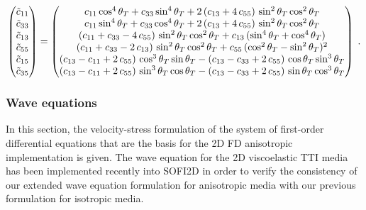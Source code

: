 \begin{equation}
    \begin{pmatrix}
    \Tilde{c}_{11} \\
    \Tilde{c}_{33} \\
    \Tilde{c}_{13} \\
    \Tilde{c}_{55} \\
    \Tilde{c}_{15} \\
    \Tilde{c}_{35} \\
    \end{pmatrix} = 
    \begin{pmatrix}
    c_{11}\cos^{4}\theta_T+c_{33}\sin^{4}\theta_T+2\,(c_{13}+4\,c_{55})\,\sin^{2}\theta_T\cos^{2}\theta_T \\
    c_{11}\sin^{4}\theta_T+c_{33}\cos^{4}\theta_T+2\,(c_{13}+4\,c_{55})\,\sin^{2}\theta_T\cos^{2}\theta_T \\
    (c_{11}+c_{33}-4\,c_{55})\,\sin^{2}\theta_T\cos^{2}\theta_T+c_{13}\,(\sin^{4}\theta_T+\cos^{4}\theta_T) \\
    (c_{11}+c_{33}-2\,c_{13})\,\sin^{2}\theta_T\cos^{2}\theta_T+c_{55}\,(\cos^{2}\theta_T-\sin^{2}\theta_T)^2 \\
    (c_{13}-c_{11}+2\,c_{55})\,\cos^{3}\theta_T\sin\theta_T-(c_{13}-c_{33}+2\,c_{55})\,\cos\theta_T\sin^{3}\theta_T \\
    (c_{13}-c_{11}+2\,c_{55})\,\sin^{3}\theta_T\cos\theta_T-(c_{13}-c_{33}+2\,c_{55})\,\sin\theta_T\cos^{3}\theta_T \\ 
    \end{pmatrix}\;.
    \label{eq:c_tti_3x3_explicit}
\end{equation}

\subsubsection{Wave equations}
In this section, the velocity-stress formulation of the system of first-order differential equations that are the basis for the 2D FD anisotropic implementation is given. The wave equation for the 2D viscoelastic TTI media has been implemented recently into SOFI2D in order to verify the consistency of our extended wave equation formulation for anisotropic media with our previous formulation for isotropic media. 

